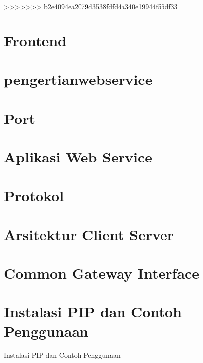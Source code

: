 \documentclass{wileySix}
\begin{document}
>>>>>>> b2e4094ea2079d3538fdfd4a340e19944f56df33
\chapter[Frontend]
{Frontend}


\chapter[Pengertian Web Service]
{pengertianwebservice}


\chapter[Port]
{Port}



\chapter[Aplikasi Web Service]
{Aplikasi Web Service}


\chapter[Protokol]
{Protokol}


\chapter[Arsitektur Client Server]
{Arsitektur Client Server}


\chapter[Common Gateway Interface]
{Common Gateway Interface}


\chapter{Instalasi PIP dan Contoh Penggunaan}
{Instalasi PIP dan Contoh Penggunaan}


%
\end{document}
